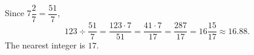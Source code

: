 Since $7\dfrac{2}{7}=\dfrac{51}{7}$,
\[
123\div\dfrac{51}{7}=\dfrac{123\cdot7}{51}=\dfrac{41\cdot7}{17}=\dfrac{287}{17}=16\dfrac{15}{17}\approx16.88 .
\]
The nearest integer is $\boxed{17}$.
